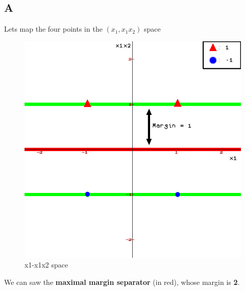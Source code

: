 \documentclass{article}
\begin{document}
        \subsection{A}
            Lets map the four points in the $(x_1, x_1x_2)$ space
            \begin{figure}[H]
                \centering
                \includegraphics[scale=0.5]{problem3/x1x2-x1.png}
                \caption{x1-x1x2 space}
            \end{figure}
            We can saw the \textbf{maximal margin separator} (in red), whose margin is \textbf{2}.\\
\end{document}
